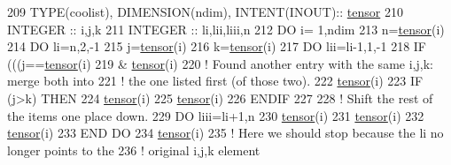 \begin{DoxyCode}
209    \textcolor{keywordtype}{TYPE}(coolist), \textcolor{keywordtype}{DIMENSION(ndim)}, \textcolor{keywordtype}{INTENT(INOUT)}:: \hyperlink{namespacetensor}{tensor}
210    \textcolor{keywordtype}{INTEGER} :: i,j,k
211    \textcolor{keywordtype}{INTEGER} :: li,lii,liii,n
212    \textcolor{keywordflow}{DO} i= 1,ndim
213       n=\hyperlink{namespacetensor}{tensor}(i)%
214       \textcolor{keywordflow}{DO} li=n,2,-1
215          j=\hyperlink{namespacetensor}{tensor}(i)%
216          k=\hyperlink{namespacetensor}{tensor}(i)%
217          \textcolor{keywordflow}{DO} lii=li-1,1,-1
218             \textcolor{keywordflow}{IF} (((j==\hyperlink{namespacetensor}{tensor}(i)%
219                  &%
      \hyperlink{namespacetensor}{tensor}(i)%
220                \textcolor{comment}{! Found another entry with the same i,j,k: merge both into}
221                \textcolor{comment}{! the one listed first (of those two). }
222                \hyperlink{namespacetensor}{tensor}(i)%
223                \textcolor{keywordflow}{IF} (j>k) \textcolor{keywordflow}{THEN}
224                   \hyperlink{namespacetensor}{tensor}(i)%
225                   \hyperlink{namespacetensor}{tensor}(i)%
226 \textcolor{keywordflow}{               ENDIF}
227                
228                \textcolor{comment}{! Shift the rest of the items one place down.}
229                \textcolor{keywordflow}{DO} liii=li+1,n
230                   \hyperlink{namespacetensor}{tensor}(i)%
231                   \hyperlink{namespacetensor}{tensor}(i)%
232                   \hyperlink{namespacetensor}{tensor}(i)%
233 \textcolor{keywordflow}{               END DO}
234                \hyperlink{namespacetensor}{tensor}(i)%
235                \textcolor{comment}{! Here we should stop because the li no longer points to the}
236                \textcolor{comment}{! original i,j,k element}

\end{DoxyCode}
